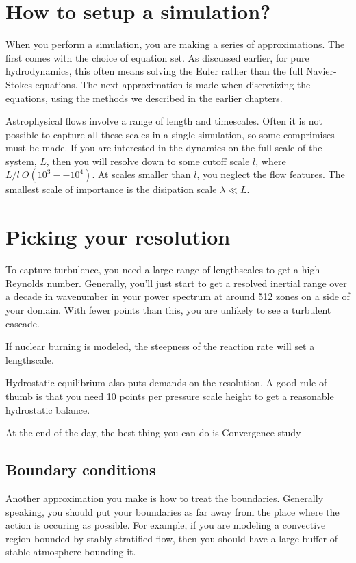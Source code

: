 \section{How to setup a simulation?}

When you perform a simulation, you are making a series of
approximations.  The first comes with the choice of equation set.  As
discussed earlier, for pure hydrodynamics, this often means solving
the Euler rather than the full Navier-Stokes equations.  The next
approximation is made when discretizing the equations, using the 
methods we described in the earlier chapters.  

Astrophysical flows involve a range of length and timescales.  Often
it is not possible to capture all these scales in a single simulation,
so some comprimises must be made.  If you are interested in the
dynamics on the full scale of the system, $L$, then you will resolve
down to some cutoff scale $l$, where $L/l ~ O(10^3--10^4)$.  At scales
smaller than $l$, you neglect the flow features.  The smallest
scale of importance is the disipation scale $\lambda \ll L$.  

\section{Picking your resolution}

To capture turbulence, you need a large range of lengthscales to get a
high Reynolds number.  Generally, you'll just start to get a resolved
inertial range over a decade in wavenumber in your power spectrum at
around 512 zones on a side of your domain.  With fewer points than
this, you are unlikely to see a turbulent cascade.

If nuclear burning is modeled, the steepness of the reaction rate will
set a lengthscale.

Hydrostatic equilibrium also puts demands on the resolution.  A good
rule of thumb is that you need 10 points per pressure scale height to
get a reasonable hydrostatic balance.

At the end of the day, the best thing you can do is 
Convergence study




\subsection{Boundary conditions}

Another approximation you make is how to treat the boundaries.
Generally speaking, you should put your boundaries as far away from
the place where the action is occuring as possible.  For example,
if you are modeling a convective region bounded by stably stratified
flow, then you should have a large buffer of stable atmosphere
bounding it.

